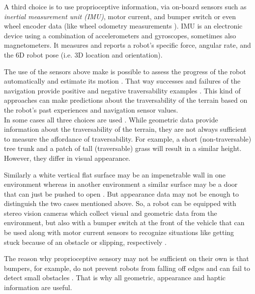\documentclass[12pt,a4paper]{report}
\newcommand{\term}{\textit}
\newcommand{\acronym}{\MakeUppercase}
\begin{document}
	A third choice is to use proprioceptive information, via on-board sensors such 
	as \term{inertial measurement unit (\acronym{imu})}, motor current, and bumper 
	switch \citep{Kim} or even wheel encoder data \citep{Lee} (like wheel odometry 
	measurements \citep{Droeschel}). \acronym{imu} is an electronic device using 
	a combination of accelerometers and gyroscopes, sometimes also magnetometers. 
	It measures and reports a robot's specific force, angular rate, and the 
	\acronym{6d} robot pose (i.e. \acronym{3d} location and orientation).
	\par
	The use of the sensors above make is possible to assess the progress of the 
	robot automatically and estimate its motion \citep{Droeschel}. That way successes 
	and failures of the navigation provide positive and negative traversability 
	examples \citep{Kim}. This kind of approaches can make predictions about the 
	traversability of the terrain based on the robot's past experiences and 
	navigation sensor values.
	\\
	
	In some cases all three choices are used \citep{Kim, Shneier}. While geometric 
	data provide information about the traversability of the terrain, they are 
	not always sufficient to measure the affordance of traversability. For 
	example, a short (non-traversable) tree trunk and a patch of tall (traversable) 
	grass will result in a similar height. However, they differ in visual 
	appearance. 
	\par 
	Similarly a white vertical flat surface may be an impenetrable wall in one 
	environment whereas in another environment a similar surface may be a door that 
	can just be pushed to open \citep{Ugur}. But appearance data may not be enough 
	to distinguish the two cases mentioned above. So, a robot can be equipped with 
	stereo vision cameras which collect visual and geometric data from the 
	environment, but also with a bumper switch at the front of the vehicle that can 
	be used along with motor current sensors to recognize situations like getting 
	stuck because of an obstacle or slipping, respectively \citep{Kim}.
	\par
	The reason why proprioceptive sensory may not be sufficient on their own is that 
	bumpers, for example, do not prevent robots from falling off edges and can fail 
	to detect small obstacles \citep{HiroseGonet}. That is why all geometric, 
	appearance and haptic information are useful.
	\\\\
	
\end{document}
